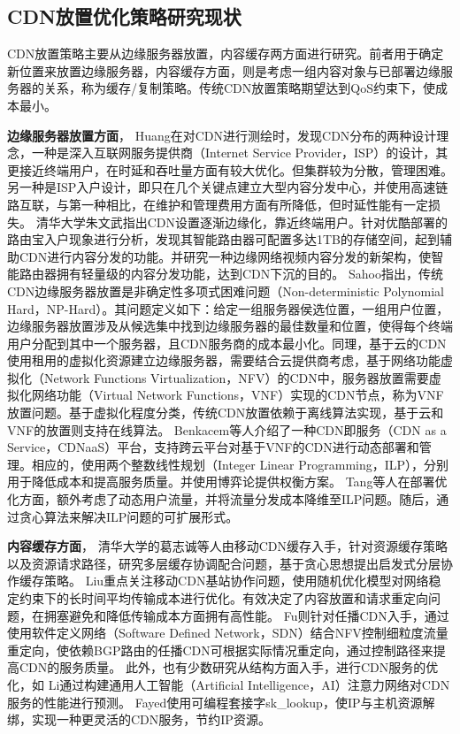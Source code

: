  
\subsection{CDN放置优化策略研究现状}

CDN放置策略主要从边缘服务器放置，内容缓存\cite{Sahoo2016}两方面进行研究。前者用于确定新位置来放置边缘服务器，内容缓存方面，则是考虑一组内容对象与已部署边缘服务器的关系，称为缓存/复制策略。传统CDN放置策略期望达到QoS约束下，使成本最小\cite{salahuddin2017survey,Pathan-survey-2007,Tang-2018}。
 

\textbf{边缘服务器放置方面}， 
Huang\cite{Huang2008}在对CDN进行测绘时，发现CDN分布的两种设计理念，一种是深入互联网服务提供商（Internet Service Provider，ISP）的设计，其更接近终端用户，在时延和吞吐量方面有较大优化。但集群较为分散，管理困难。另一种是ISP入户设计，即只在几个关键点建立大型内容分发中心，并使用高速链路互联，与第一种相比，在维护和管理费用方面有所降低，但时延性能有一定损失。
清华大学朱文武\cite{zhu-2021}指出CDN设置逐渐边缘化，靠近终端用户。针对优酷部署的路由宝入户现象进行分析，发现其智能路由器可配置多达1TB的存储空间，起到辅助CDN进行内容分发的功能。并研究一种边缘网络视频内容分发的新架构，使智能路由器拥有轻量级的内容分发功能，达到CDN下沉的目的。
Sahoo\cite{Sahoo2016}指出，传统CDN边缘服务器放置是非确定性多项式困难问题（Non-deterministic Polynomial Hard，NP-Hard）。其问题定义如下：给定一组服务器侯选位置，一组用户位置，边缘服务器放置涉及从候选集中找到边缘服务器的最佳数量和位置，使得每个终端用户分配到其中一个服务器，且CDN服务商的成本最小化。同理，基于云的CDN使用租用的虚拟化资源建立边缘服务器，需要结合云提供商考虑，基于网络功能虚拟化（Network Functions Virtualization，NFV）的CDN中，服务器放置需要虚拟化网络功能（Virtual Network Functions，VNF）实现的CDN节点，称为VNF放置问题。基于虚拟化程度分类，传统CDN放置依赖于离线算法实现，基于云和VNF的放置则支持在线算法。
Benkacem\cite{benkacem2018optimal}等人介绍了一种CDN即服务（CDN as a Service，CDNaaS）平台，支持跨云平台对基于VNF的CDN进行动态部署和管理。相应的，使用两个整数线性规划（Integer Linear Programming，ILP），分别用于降低成本和提高服务质量。并使用博弈论提供权衡方案。
Tang\cite{Tang-2018}等人在部署优化方面，额外考虑了动态用户流量，并将流量分发成本降维至ILP问题。随后，通过贪心算法来解决ILP问题的可扩展形式。

\textbf{内容缓存方面}，
清华大学的葛志诚\cite{葛志诚2018一种移动内容分发网络的分层协同缓存机制}等人由移动CDN缓存入手，针对资源缓存策略以及资源请求路径，研究多层缓存协调配合问题，基于贪心思想提出启发式分层协作缓存策略。
Liu\cite{liu2018}重点关注移动CDN基站协作问题，使用随机优化模型对网络稳定约束下的长时间平均传输成本进行优化。有效决定了内容放置和请求重定向问题，在拥塞避免和降低传输成本方面拥有高性能。
Fu\cite{fu2018}则针对任播CDN入手，通过使用软件定义网络（Software Defined Network，SDN）结合NFV控制细粒度流量重定向，使依赖BGP路由的任播CDN可根据实际情况重定向，通过控制路径来提高CDN的服务质量。
此外，也有少数研究从结构方面入手，进行CDN服务的优化，如
Li\cite{Li-2019-AI-attention-CDN}通过构建通用人工智能（Artificial Intelligence，AI）注意力网络对CDN服务的性能进行预测。
Fayed\cite{Fayed-IpUnbind-2021}使用可编程套接字sk\_lookup，使IP与主机资源解绑，实现一种更灵活的CDN服务，节约IP资源。


